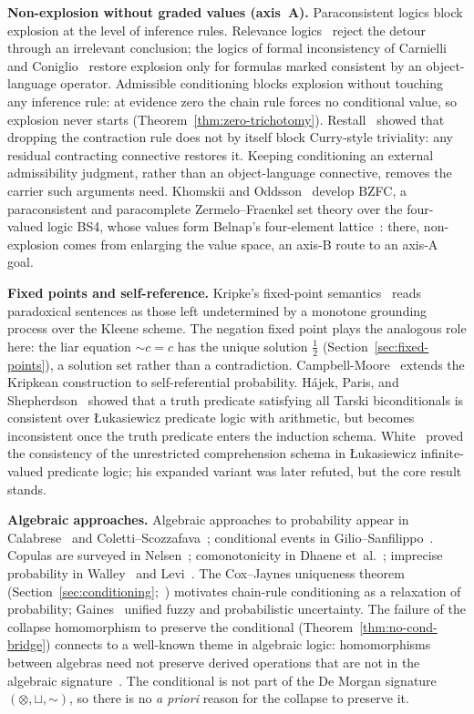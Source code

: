 \documentclass[11pt,a4paper]{article}
\newcommand{\negc}{\mathord{\sim}}
\newcommand{\conjc}{\otimes}
\newcommand{\disjc}{\sqcup}
\begin{document}
\textbf{Non-explosion without graded values (axis~A).}
Paraconsistent logics block explosion at the level of inference
rules.
Relevance logics~\cite{anderson1975} reject the detour through an
irrelevant conclusion; the logics of formal inconsistency of
Carnielli and Coniglio~\cite{carnielli2016} restore explosion only
for formulas marked consistent by an object-language operator.
Admissible conditioning blocks explosion without touching any
inference rule: at evidence zero the chain rule forces no
conditional value, so explosion never starts
(Theorem~\ref{thm:zero-trichotomy}).
Restall~\cite{restall1993} showed that dropping the contraction
rule does not by itself block Curry-style triviality: any residual
contracting connective restores it.
Keeping conditioning an external admissibility judgment, rather
than an object-language connective, removes the carrier such
arguments need.
Khomskii and Oddsson~\cite{khomskii2024} develop BZFC, a
paraconsistent and paracomplete Zermelo--Fraenkel set theory over
the four-valued logic BS4, whose values form Belnap's
four-element lattice~\cite{belnap1977}: there, non-explosion comes
from enlarging the value space, an axis-B route to an axis-A goal.

\textbf{Fixed points and self-reference.}
Kripke's fixed-point semantics~\cite{kripke1975} reads paradoxical
sentences as those left undetermined by a monotone grounding
process over the Kleene scheme.
The negation fixed point plays the analogous role here: the liar
equation $\negc c = c$ has the unique solution $\tfrac{1}{2}$
(Section~\ref{sec:fixed-points}), a solution set rather than a
contradiction.
Campbell-Moore~\cite{campbellmoore2015} extends the Kripkean
construction to self-referential probability.
H\'ajek, Paris, and Shepherdson~\cite{hajek2000liar} showed that a
truth predicate satisfying all Tarski biconditionals is consistent
over {\L}ukasiewicz predicate logic with arithmetic, but becomes
inconsistent once the truth predicate enters the induction schema.
White~\cite{white1979} proved the consistency of the unrestricted
comprehension schema in {\L}ukasiewicz infinite-valued predicate
logic; his expanded variant was later refuted, but the core result
stands.

\textbf{Algebraic approaches.}
Algebraic approaches to probability appear in
Calabrese~\cite{calabrese1987} and
Coletti--Scozzafava~\cite{coletti2002};
conditional events in
Gilio--Sanfilippo~\cite{gilio2013,gilio2014}.
Copulas are surveyed in Nelsen~\cite{nelsen2006}; comonotonicity
in Dhaene et~al.~\cite{dhaene2002};
imprecise probability in Walley~\cite{walley1991} and
Levi~\cite{levi1980}.
The Cox--Jaynes uniqueness theorem
(Section~\ref{sec:conditioning};~\cite{cox1961,jaynes2003})
motivates chain-rule conditioning as a relaxation of probability;
Gaines~\cite{gaines1978} unified fuzzy and probabilistic
uncertainty.
The failure of the collapse homomorphism to preserve the conditional
(Theorem~\ref{thm:no-cond-bridge}) connects to a well-known theme in
algebraic logic: homomorphisms between algebras need not preserve
derived operations that are not in the algebraic
signature~\cite{font2003}.
The conditional is not part of the De Morgan signature
$(\conjc, \disjc, \negc)$, so there is no \emph{a priori} reason for
the collapse to preserve it.
\end{document}

